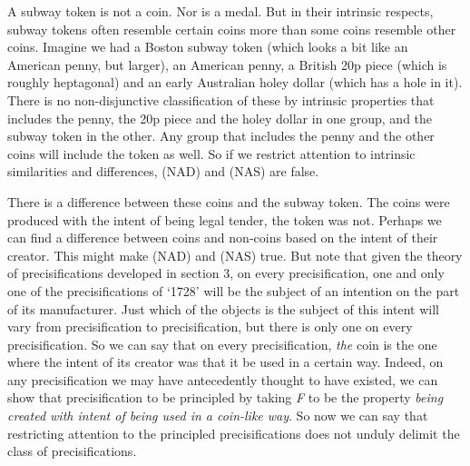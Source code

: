 \documentclass[
  11pt,
  letterpaper,
  DIV=11,
  numbers=noendperiod,
  oneside]{scrartcl}
\begin{document}
A subway token is not a coin. Nor is a medal. But
in their intrinsic respects, subway tokens often resemble certain coins
more than some coins resemble other coins. Imagine we had a Boston
subway token (which looks a bit like an American penny, but larger), an
American penny, a British 20p piece (which is roughly heptagonal) and an
early Australian holey dollar (which has a hole in it). There is no
non-disjunctive classification of these by intrinsic properties that
includes the penny, the 20p piece and the holey dollar in one group, and
the subway token in the other. Any group that includes the penny and the
other coins will include the token as well. So if we restrict attention
to intrinsic similarities and differences, (NAD) and (NAS) are false.

There is a difference between these coins and the subway token. The
coins were produced with the intent of being legal tender, the token was
not. Perhaps we can find a difference between coins and non-coins based
on the intent of their creator. This might
make (NAD) and (NAS) true. But note that given the theory of
precisifications developed in section 3, on every precisification, one
and only one of the precisifications of `1728' will be the subject of an
intention on the part of its manufacturer. Just which of the objects is
the subject of this intent will vary from precisification to
precisification, but there is only one on every precisification. So we
can say that on every precisification, \emph{the} coin is the one where
the intent of its creator was that it be used in a certain way. Indeed,
on any precisification we may have antecedently thought to have existed,
we can show that precisification to be principled by taking \emph{F} to
be the property \emph{being created with intent of being used in a
coin-like way}. So now we can say that
restricting attention to the principled precisifications does not unduly
delimit the class of precisifications.
\end{document}
